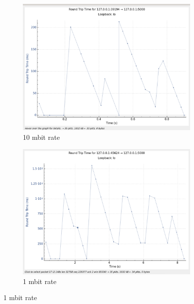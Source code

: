 \documentclass{report}
\begin{document}
\begin{figure}[H]
    \centering
    \begin{subfigure}[b]{0.45\textwidth}
        \centering
        \includegraphics[width=\textwidth]{Pics/Vegas/r10mbit_s1m_rtt}
        \caption{10 mbit rate}
    \end{subfigure}
    \hfill
    \begin{subfigure}[b]{0.45\textwidth}
        \centering
        \includegraphics[width=\textwidth]{Pics/Vegas/r1mbit_s1m_rtt}
        \caption{1 mbit rate}
    \end{subfigure}
    \medskip


\end{figure}
\end{document}
